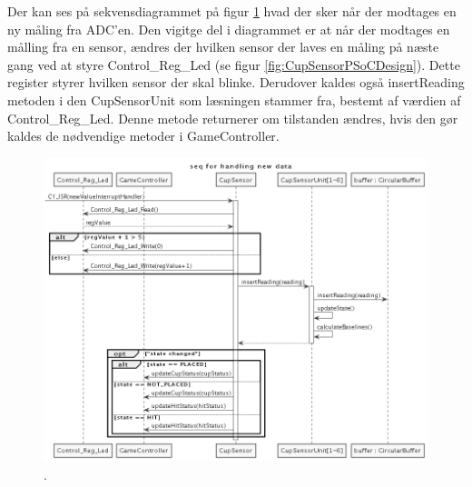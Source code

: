 \documentclass[Rapport/Rapport_main.tex]{subfiles}
\begin{document}
Der kan ses på sekvensdiagrammet på figur \ref{fig:CupSensor-IF-getting-reading} hvad der sker når der modtages en ny måling fra ADC'en. Den vigitge del i diagrammet er at når der modtages en målling fra en sensor, ændres der hvilken sensor der laves en måling på næste gang ved at styre Control\_Reg\_Led (se figur \ref{fig:CupSensorPSoCDesign}). Dette register styrer hvilken sensor der skal blinke. Derudover kaldes også insertReading metoden i den CupSensorUnit som læsningen stammer fra, bestemt af værdien af Control\_Reg\_Led. Denne metode returnerer om tilstanden ændres, hvis den gør kaldes de nødvendige metoder i GameController. 
\begin{figure}[H]
    \centering
    \includegraphics[width=1\textwidth]{Softwaredesign/CupSensor_IF/graphics/getting_reading.png}
    \caption{.}
    \label{fig:CupSensor-IF-getting-reading}
\end{figure}
\end{document}

